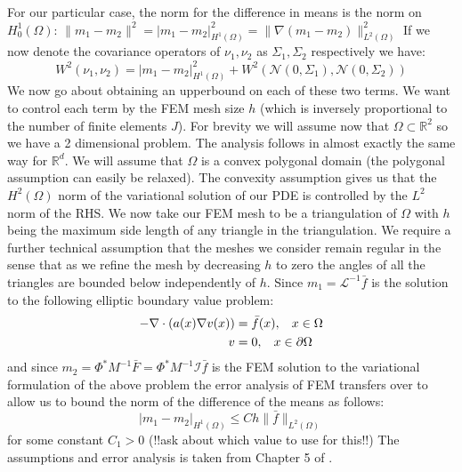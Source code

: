 \documentclass{article}
\theoremstyle{definition}
\theoremstyle{remark}
\begin{document}
For our particular case, the norm for the difference in means is the norm on $H_{0}^{1}(\Omega)$: $\|m_1-m_2\|^{2}=|m_1-m_2|_{H^1(\Omega)}^{2}=\|\nabla(m_1-m_2)\|_{L^2(\Omega)}^{2}$ If we now denote the covariance operators of $\nu_{1},\nu_{2}$ as $\Sigma_{1},\Sigma_{2}$ respectively we have:
\begin{equation*}
    W^{2}(\nu_1,\nu_2)=|m_1-m_2|_{H^{1}(\Omega)}^{2}+W^{2}(\mathcal{N}(0,\Sigma_1),\mathcal{N}(0,\Sigma_2))
\end{equation*}
We now go about obtaining an upperbound on each of these two terms. We want to control each term by the FEM mesh size $h$ (which is inversely proportional to the number of finite elements $J$). For brevity we will assume now that $\Omega\subset\mathbb{R}^{2}$ so we have a 2 dimensional problem. The analysis follows in almost exactly the same way for $\mathbb{R}^{d}$. We will assume that $\Omega$ is a convex polygonal domain (the polygonal assumption can easily be relaxed). The convexity assumption gives us that the $H^2(\Omega)$ norm of the variational solution of our PDE is controlled by the $L^2$ norm of the RHS. We now take our FEM mesh to be a triangulation of $\Omega$ with $h$ being the maximum side length of any triangle in the triangulation. We require a further technical assumption that the meshes we consider remain regular in the sense that as we refine the mesh by decreasing $h$ to zero the angles of all the triangles are bounded below independently of $h$. Since $m_1=\mathcal{L}^{-1}\bar{f}$ is the solution to the following elliptic boundary value problem:
\begin{align*}
    \begin{split}
        -\nabla\cdot(a(x)\nabla v(x))&=\bar{f}(x), \hspace{0.3cm} x\in\Omega \\
        v&=0, \hspace{0.3cm} x\in\partial\Omega
    \end{split}
\end{align*}
and since $m_2=\Phi^{*}M^{-1}\bar{F}=\Phi^{*}M^{-1}\mathcal{I}\bar{f}$ is the FEM solution to the variational formulation of the above problem the error analysis of FEM transfers over to allow us to bound the norm of the difference of the means as follows:
\begin{equation}
    \label{bound_on_diff_means}
    |m_1-m_2|_{H^{1}(\Omega)}\leq Ch\|\bar{f}\|_{L^2(\Omega)}
\end{equation}
for some constant $C_{1}>0$ (!!ask about which value to use for this!!)
The assumptions and error analysis is taken from Chapter 5 of \cite{larsson2008partial}. \\
\end{document}
